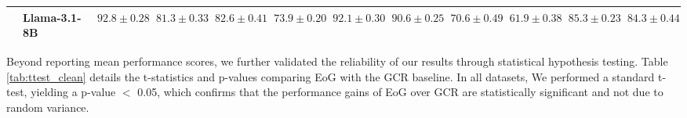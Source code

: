 \begin{table}[t]
{\begin{tabular}{llcccccccccc}
 & Llama-3.1-8B & \textbf{$92.8 \pm 0.28$} & \textbf{$81.3 \pm 0.33$} & \textbf{$82.6 \pm 0.41$} & \textbf{$73.9 \pm 0.20$} & \textbf{$92.1 \pm 0.30$} & \textbf{$90.6 \pm 0.25$} & \textbf{$70.6 \pm 0.49$} & \textbf{$61.9 \pm 0.38$} & \textbf{$85.3 \pm 0.23$} & \textbf{$84.3 \pm 0.44$} \\








\bottomrule
\end{tabular}
}
\end{table}

Beyond reporting mean performance scores, we further validated the reliability of our results through statistical hypothesis testing. Table \ref{tab:ttest_clean} details the t-statistics and p-values comparing EoG with the GCR baseline.  In all datasets, We performed a standard t-test, yielding a p-value $<$ 0.05, which confirms that the performance gains of EoG over GCR are statistically significant and not due to random variance.

